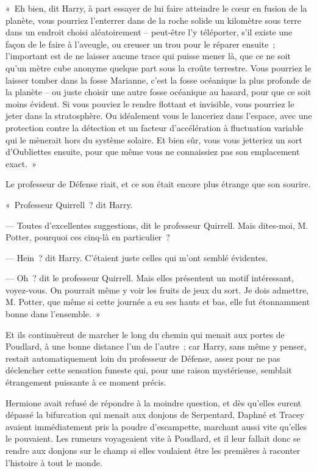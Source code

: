 «~Eh bien, dit Harry, à part essayer de lui faire atteindre le cœur en fusion de la planète, vous pourriez l'enterrer dans de la roche solide un kilomètre sous terre dans un endroit choisi aléatoirement -- peut-être l'y téléporter, s'il existe une façon de le faire à l'aveugle, ou creuser un trou pour le réparer ensuite~; l'important est de ne laisser aucune trace qui puisse mener là, que ce ne soit qu'un mètre cube anonyme quelque part sous la croûte terrestre. Vous pourriez le laisser tomber dans la fosse Marianne, c'est la fosse océanique la plus profonde de la planète -- ou juste choisir une autre fosse océanique au hasard, pour que ce soit moins évident. Si vous pouviez le rendre flottant et invisible, vous pourriez le jeter dans la stratosphère. Ou idéalement vous le lanceriez dans l'espace, avec une protection contre la détection et un facteur d'accélération à fluctuation variable qui le mènerait hors du système solaire. Et bien sûr, vous vous jetteriez un sort d'Oubliettes ensuite, pour que même vous ne connaissiez pas son emplacement exact.~»

Le professeur de Défense riait, et ce son était encore plus étrange que son sourire.

«~Professeur Quirrell~? dit Harry.

--- Toutes d'excellentes suggestions, dit le professeur Quirrell. Mais dites-moi, M. Potter, pourquoi ces cinq-là en particulier~?

--- Hein~? dit Harry. C'étaient juste celles qui m'ont semblé évidentes.

--- Oh~? dit le professeur Quirrell. Mais elles présentent un motif intéressant, voyez-vous. On pourrait même y voir les fruits de jeux du sort. Je dois admettre, M. Potter, que même si cette journée a eu ses hauts et bas, elle fut étonnamment bonne dans l'ensemble.~»

Et ils continuèrent de marcher le long du chemin qui menait aux portes de Poudlard, à une bonne distance l'un de l'autre~; car Harry, sans même y penser, restait automatiquement loin du professeur de Défense, assez pour ne pas déclencher cette sensation funeste qui, pour une raison mystérieuse, semblait étrangement puissante à ce moment précis.


Hermione avait refusé de répondre à la moindre question, et dès qu'elles eurent dépassé la bifurcation qui menait aux donjons de Serpentard, Daphné et Tracey avaient immédiatement pris la poudre d'escampette, marchant aussi vite qu'elles le pouvaient. Les rumeurs voyageaient vite à Poudlard, et il leur fallait donc se rendre aux donjons sur le champ si elles voulaient être les premières à raconter l'histoire à tout le monde.


